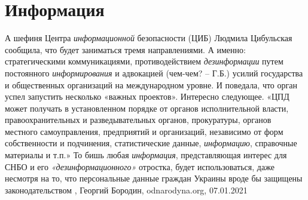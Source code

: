  
 
 
 
 
\chapter{Информация}
\label{sec:slova.informacia}

А  шефиня Центра \emph{информационной} безопасности (ЦИБ) Людмила Цибульская
сообщила, что будет заниматься тремя направлениями. А именно: стратегическими
коммуникациями, противодействием \emph{дезинформации} путем постоянного
\emph{информирования} и адвокацией (чем-чем? – Г.Б.) усилий государства и
общественных организаций на международном уровне. И поведала, что орган успел
запустить несколько «важных проектов».  Интересно следующее. «ЦПД может
получать в установленном порядке от органов исполнительной власти,
правоохранительных и разведывательных органов, прокуратуры, органов местного
самоуправления, предприятий и организаций, независимо от форм собственности и
подчинения, статистические данные, \emph{информацию}, справочные материалы и
т.п.» То бишь любая \emph{информация}, представляющая интерес для СНБО и его
\emph{«дезинформационного»} отростка, будет использоваться, даже несмотря на
то, что персональные данные граждан Украины вроде бы защищены законодательством
, Георгий Бородин, odnarodyna.org, 07.01.2021


